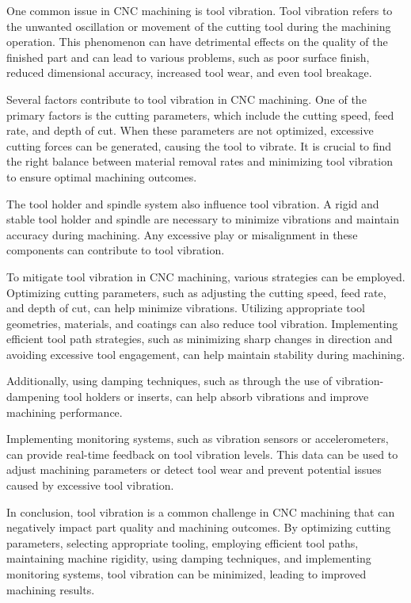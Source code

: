 One common issue in CNC machining is tool vibration. Tool vibration refers to the unwanted oscillation or movement of the cutting tool during the machining operation. This phenomenon can have detrimental effects on the quality of the finished part and can lead to various problems, such as poor surface finish, reduced dimensional accuracy, increased tool wear, and even tool breakage.

Several factors contribute to tool vibration in CNC machining. One of the primary factors is the cutting parameters, which include the cutting speed, feed rate, and depth of cut. When these parameters are not optimized, excessive cutting forces can be generated, causing the tool to vibrate. It is crucial to find the right balance between material removal rates and minimizing tool vibration to ensure optimal machining outcomes.

The tool holder and spindle system also influence tool vibration. A rigid and stable tool holder and spindle are necessary to minimize vibrations and maintain accuracy during machining. Any excessive play or misalignment in these components can contribute to tool vibration.

To mitigate tool vibration in CNC machining, various strategies can be employed. Optimizing cutting parameters, such as adjusting the cutting speed, feed rate, and depth of cut, can help minimize vibrations. Utilizing appropriate tool geometries, materials, and coatings can also reduce tool vibration. Implementing efficient tool path strategies, such as minimizing sharp changes in direction and avoiding excessive tool engagement, can help maintain stability during machining.

Additionally, using damping techniques, such as through the use of vibration-dampening tool holders or inserts, can help absorb vibrations and improve machining performance.

Implementing monitoring systems, such as vibration sensors or accelerometers, can provide real-time feedback on tool vibration levels. This data can be used to adjust machining parameters or detect tool wear and prevent potential issues caused by excessive tool vibration.

In conclusion, tool vibration is a common challenge in CNC machining that can negatively impact part quality and machining outcomes. By optimizing cutting parameters, selecting appropriate tooling, employing efficient tool paths, maintaining machine rigidity, using damping techniques, and implementing monitoring systems, tool vibration can be minimized, leading to improved machining results.

